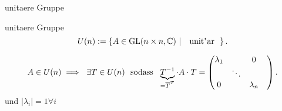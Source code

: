 \documentclass[class=article, crop=false]{standalone}
\begin{document}
\begin{zettel}{unitaere Gruppe}
\begin{flashcard}[5c5h2hjm]{unitaere Gruppe}
	\[
		U (n) := \set{A \in  \GL(n \times n,\C )}{\tx{ unit"ar } }
	.\]
\end{flashcard}
\begin{corollary}
	\[
		A \in  U(n) \implies  \exists  T \in  U(n) \tx{ sodass } \underbrace{T^{-1}}_{ = \bar{T}^T} \cdot  A \cdot  T =
		\begin{pmatrix}
			\lambda_1 &        & 0           \\
			          & \ddots &           & \\
			0         &        & \lambda_n   \\
		\end{pmatrix}
	.\]
	und $ |\lambda_i| = 1 \forall i$
\end{corollary}
\end{zettel}
\end{document}
